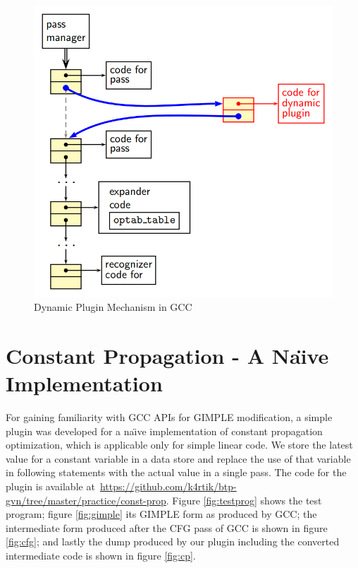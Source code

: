 \begin{figure}[htb]
\centering
\includegraphics[scale=0.65]{./dynamic-plugin1}
\caption{Dynamic Plugin Mechanism in GCC\cite{grc}}
\label{fig:dynamic-plugin}
\end{figure}

\pagebreak
\section{Constant Propagation - A Na\"{\i}ve Implementation}
For gaining familiarity with GCC APIs for GIMPLE modification, a simple plugin was developed for a na\"{\i}ve implementation of constant propagation optimization, which is applicable only for simple linear code. We store the latest value for a constant variable in a data store and replace the use of that variable in following statements with the actual value in a single pass. The code for the plugin is available at\ \url{https://github.com/k4rtik/btp-gvn/tree/master/practice/const-prop}. Figure \ref{fig:testprog} shows the test program; figure \ref{fig:gimple} its GIMPLE form as produced by GCC; the intermediate form produced after the CFG pass of GCC is shown in figure \ref{fig:cfg}; and lastly the dump produced by our plugin including the converted intermediate code is shown in figure \ref{fig:cp}.

